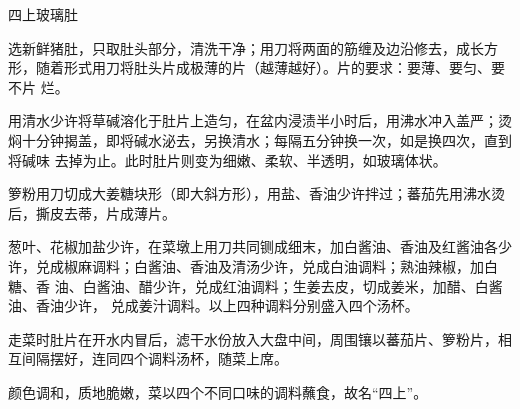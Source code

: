 \begin{recipe}{四上玻璃肚}

\ingredients


\preparation

\step 选新鲜猪肚，只取肚头部分，清洗干净；用刀将两面的筋缠及边沿修去，成长方
形，随着形式用刀将肚头片成极薄的片（越薄越好）。片的要求：要薄、要匀、要不片
烂。

\step 用清水少许将草碱溶化于肚片上造匀，在盆内浸渍半小时后，用沸水冲入盖严；烫
焖十分钟揭盖，即将碱水泌去，另换清水；每隔五分钟换一次，如是换四次，直到将碱味
去掉为止。此时肚片则变为细嫩、柔软、半透明，如玻璃体状。

\step 箩粉用刀切成大姜糖块形（即大斜方形），用盐、香油少许拌过；蕃茄先用沸水烫
后，撕皮去蒂，片成薄片。

\step 葱叶、花椒加盐少许，在菜墩上用刀共同铡成细末，加白酱油、香油及红酱油各少
许，兑成椒麻调料；白酱油、香油及清汤少许，兑成白油调料；熟油辣椒，加白糖、香
油、白酱油、醋少许，兑成红油调料；生姜去皮，切成姜米，加醋、白酱油、香油少许，
兑成姜汁调料。以上四种调料分别盛入四个汤杯。

\step 走菜时肚片在开水内冒后，滤干水份放入大盘中间，周围镶以蕃茄片、箩粉片，相
互间隔摆好，连同四个调料汤杯，随菜上席。

\features

颜色调和，质地脆嫩，菜以四个不同口味的调料蘸食，故名“四上”。

\end{recipe}

